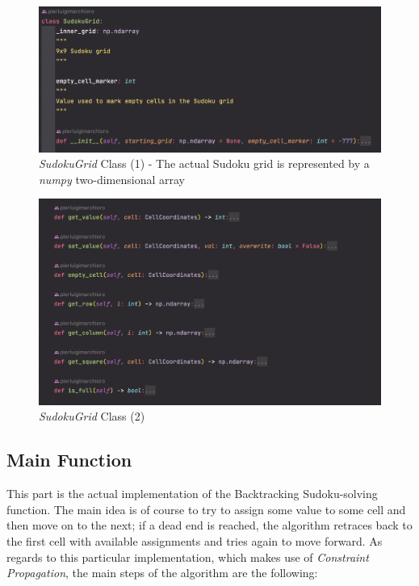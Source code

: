 \begin{figure}[h]
    \centering
    \includegraphics[scale=0.65]{assignment-1/images/cp/data-2_1-grid.png}
    \caption{\textit{SudokuGrid} Class (1) - The actual Sudoku grid is represented by a \textit{numpy} two-dimensional array}
    \label{fig:data_2_1}
\end{figure}

\begin{figure}[h]
    \centering
    \includegraphics[scale=0.65]{assignment-1/images/cp/data-2_2-grid.png}
    \caption{\textit{SudokuGrid} Class (2)}
    \label{fig:data_2_2}
\end{figure}


\subsection{Main Function}

This part is the actual implementation of the Backtracking Sudoku-solving function. The main idea is of course to try to assign some value to some cell and then move on to the next; if a dead end is reached, the algorithm retraces back to the first cell with available assignments and tries again to move forward. 
As regards to this particular implementation, which makes use of \textit{Constraint Propagation}, the main steps of the algorithm are the following:

